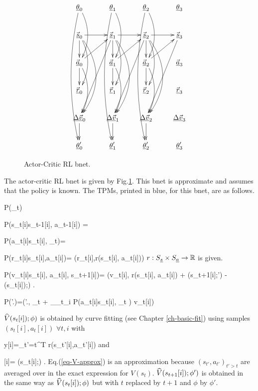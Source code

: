 \begin{figure}
\centering
$$\xymatrix{
\rvtheta_0\ar@/^1pc/[dd]\ar@/_1pc/[ddddd]&
\rvtheta_1\ar@/^1pc/[dd]\ar@/_1pc/[ddddd]&
\rvtheta_2\ar@/^1pc/[dd]\ar@/_1pc/[ddddd]&
\rvtheta_3\\
\vec{\rvs}_0\ar[r]\ar[d]\ar@/^1pc/[dd]
\ar@/^2pc/[ddd]&
\vec{\rvs}_1\ar[r]\ar[d]\ar@/^1pc/[dd]
\ar@/^2pc/[ddd]\ar[dddl]&
\vec{\rvs}_2\ar[r]\ar[d]\ar@/^1pc/[dd]
\ar@/^2pc/[ddd]\ar[dddl]&
\vec{\rvs}_3\ar[dddl]\\
\vec{\rva}_0\ar[d]\ar[ur]\ar@/^1pc/[dd]&
\vec{\rva}_1\ar[d]\ar[ur]\ar@/^1pc/[dd]&
\vec{\rva}_2\ar[d]\ar[ur]\ar@/^1pc/[dd]&
\vec{\rva}_3\\
\vec{\rvr}_0&
\vec{\rvr}_1&
\vec{\rvr}_2&
\vec{\rvr}_3\\
\ul{\Delta \vec{v}}_0\ar[d]&
\ul{\Delta \vec{v}}_1\ar[d]&
\ul{\Delta \vec{v}}_2\ar[d]&
\ul{\Delta \vec{v}}_3\\
\rvtheta'_0&
\rvtheta'_1&
\rvtheta'_2&
\rvtheta'_3
}$$
\caption{Actor-Critic RL bnet.  }
\label{fig-ac-rl}
\end{figure}
The actor-critic RL bnet
is given by Fig.\ref{fig-ac-rl}. This
bnet is approximate and assumes
that the policy is known. The
TPMs, printed in blue, for this bnet,
are as follows.



\beq\color{blue}
P(\theta_t) 
\eeq

\beq\color{blue}
P(s_t[i]\cond s_{t-1}[i], a_{t-1}[i]) =  
\eeq

\beq\color{blue}
P(a_t[i]\cond s_t[i], \theta_t)= 
\eeq

\beq\color{blue}
P(r_t[i]\cond s_t[i],a_t[i])=
\delta(r_t[i],r(s_t[i], a_t[i]))
\eeq
$r:S_{\underline{s}}\times S_{\underline{a}}\rightarrow{ \mathbb{R}} $ is given.

\beq\color{blue}
P(\Delta v_t[i]\cond s_t[i], a_t[i], s_{t+1}[i])=
\delta(\Delta v_t[i], r(s_t[i], a_t[i]) +
\gamma {}(s_{t+1}[i];\phi')
- (s_t[i]);\phi)
\;.
\eeq

\beq\color{blue}
P(\theta'.)=\delta(\theta'.,
\theta_t +
\alpha \partial_{\theta_t}\sum_i
\ln P(a_t[i]\cond s_t[i], \theta_t )
\Delta v_t[i])
\eeq

$\widehat{V}(s_t[i]);\phi)$ is
obtained by curve fitting
 (see Chapter \ref{ch-basic-fit})
using samples $(s_t[i], a_t[i])$ 
$\forall t,i$
with

\beq
 y[i]=\sum_{t'=t}^{T}
r(s_{t'}[i],a_{t'}[i])
\label{eq-V-approx}
\eeq
and 

\beq
{}[i]=
(s_t[i];\phi)
\;.
\eeq
Eq.(\ref{eq-V-approx}) 
is an approximation
because $(s_{t'}, a_{t'})_{t'>t}$ 
are averaged over in the exact
expression for $V(s_t)$.
$\widehat{V}(s_{t+1}[i]);\phi')$ is
obtained in the same way as
$\widehat{V}(s_t[i]);\phi)$
but with $t$ replaced by $t+1$
and $\phi$ by $\phi'$.

